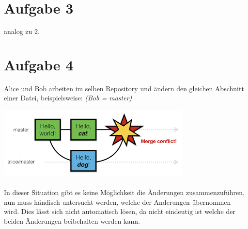 \documentclass[12pt, a4paper]{article}
\begin{document}
\section{Aufgabe 3}
analog zu 2.

\section{Aufgabe 4}
\paragraph{}
Alice und Bob arbeiten im selben Repository und ändern den gleichen Abschnitt einer Datei, beispielsweise: \textit{(Bob = master)}\par 
\includegraphics[scale=1]{mergeConflict.png}
\paragraph{}
In dieser Situation gibt es keine Möglichkeit die Änderungen zusammenzuführen, nun muss händisch untersucht werden, welche der Anderungen übernommen wird. Dies lässt sich nicht automatisch lösen, da nicht eindeutig ist welche der beiden Änderungen beibehalten werden kann.
\end{document}
